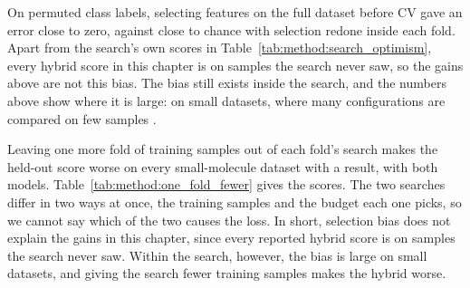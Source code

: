 On permuted class labels, selecting features on the full dataset before CV gave \citet{Ambroise2002} an error close to zero, against close to chance with selection redone inside each fold. Apart from the search's own scores in Table~\ref{tab:method:search_optimism}, every hybrid score in this chapter is on samples the search never saw, so the gains above are not this bias. The bias still exists inside the search, and the numbers above show where it is large: on small datasets, where many configurations are compared on few samples \citep{Tibshirani2015}.

Leaving one more fold of training samples out of each fold's search makes the held-out score worse on every small-molecule dataset with a result, with both models. Table~\ref{tab:method:one_fold_fewer} gives the scores. The two searches differ in two ways at once, the training samples and the budget each one picks, so we cannot say which of the two causes the loss. In short, selection bias does not explain the gains in this chapter, since every reported hybrid score is on samples the search never saw. Within the search, however, the bias is large on small datasets, and giving the search fewer training samples makes the hybrid worse.


